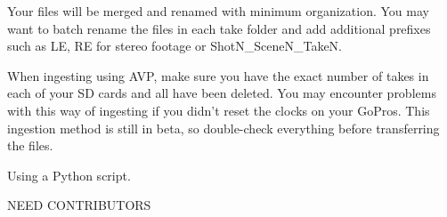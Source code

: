 \begin{fullwidth}

Your files will be merged and renamed with minimum organization. You may want to batch rename the files in each take folder and add additional prefixes such as LE, RE for stereo footage or ShotN\_SceneN\_TakeN.

\tip When ingesting using AVP, make sure you have the exact number of takes in each of your SD cards and all \textbf{} have been deleted. You may encounter problems with this way of ingesting if you didn't reset the clocks on your GoPros. This ingestion method is still in beta, so double-check everything before transferring the files.

{\large Using a Python script. \par}

NEED CONTRIBUTORS

\clearpage
\end{fullwidth}

